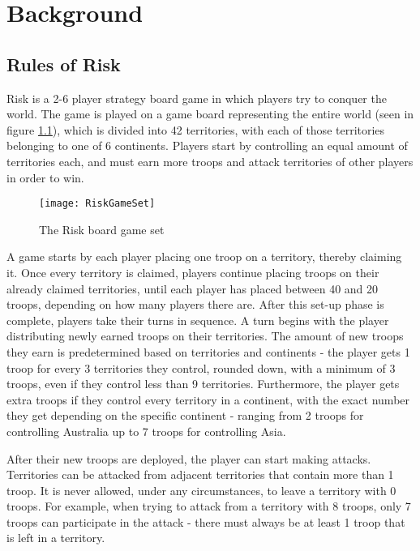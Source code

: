\graphicspath{ {./Images/} }
\chapter{Background}
\label{background}
\section{Rules of Risk}
\label{rulesOfRisk}

Risk \cite{riskrules} is a 2-6 player strategy board game in which players try to conquer the world. The game is played on a game board representing the entire world (seen in figure \ref{fig:RiskGameSet}), which is divided into 42 territories, with each of those territories belonging to one of 6 continents. Players start by controlling an equal amount of territories each, and must earn more troops and attack territories of other players in order to win.

\begin{figure}[H]
\texttt{[image: RiskGameSet]}
\caption{The Risk board game set}
\label{fig:RiskGameSet}
\end{figure}

A game starts by each player placing one troop on a territory, thereby claiming it. Once every territory is claimed, players continue placing troops on their already claimed territories, until each player has placed between 40 and 20 troops, depending on how many players there are. After this set-up phase is complete, players take their turns in sequence. A turn begins with the player distributing newly earned troops on their territories. The amount of new troops they earn is predetermined based on territories and continents - the player gets 1 troop for every 3 territories they control, rounded down, with a minimum of 3 troops, even if they control less than 9 territories. Furthermore, the player gets extra troops if they control every territory in a continent, with the exact number they get depending on the specific continent - ranging from 2 troops for controlling Australia up to 7 troops for controlling Asia.

After their new troops are deployed, the player can start making attacks. Territories can be attacked from adjacent territories that contain more than 1 troop. It is never allowed, under any circumstances, to leave a territory with 0 troops. For example, when trying to attack from a territory with 8 troops, only 7 troops can participate in the attack - there must always be at least 1 troop that is left in a territory. 


